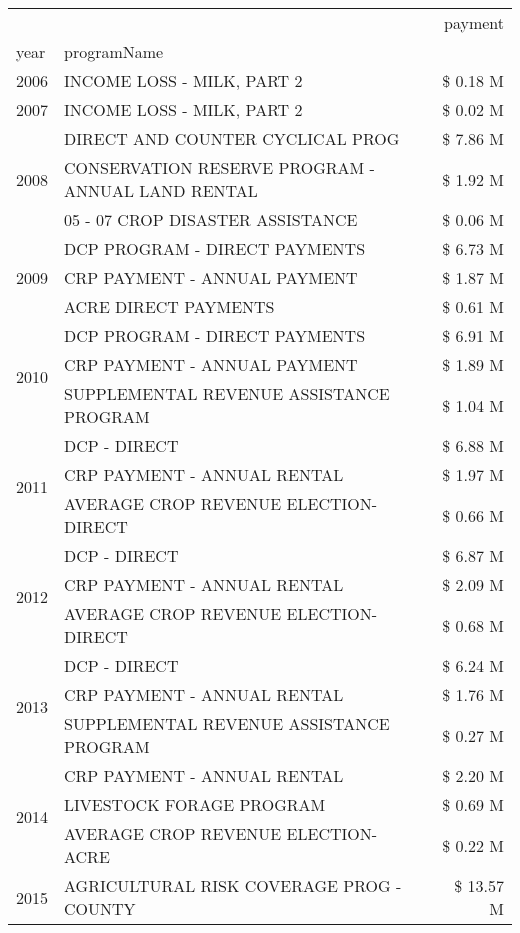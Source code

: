 \begin{tabular}{llr}
\toprule
 &  & payment \\
year & programName &  \\
\midrule
2006 & INCOME LOSS - MILK, PART 2 & \$ 0.18 M \\
\cline{1-3}
2007 & INCOME LOSS - MILK, PART 2 & \$ 0.02 M \\
\cline{1-3}
\multirow[t]{3}{*}{2008} & DIRECT AND COUNTER CYCLICAL PROG & \$ 7.86 M \\
 & CONSERVATION RESERVE PROGRAM - ANNUAL LAND RENTAL & \$ 1.92 M \\
 & 05 - 07 CROP DISASTER ASSISTANCE & \$ 0.06 M \\
\cline{1-3}
\multirow[t]{3}{*}{2009} & DCP PROGRAM - DIRECT PAYMENTS & \$ 6.73 M \\
 & CRP PAYMENT - ANNUAL PAYMENT & \$ 1.87 M \\
 & ACRE DIRECT PAYMENTS & \$ 0.61 M \\
\cline{1-3}
\multirow[t]{3}{*}{2010} & DCP PROGRAM - DIRECT PAYMENTS & \$ 6.91 M \\
 & CRP PAYMENT - ANNUAL PAYMENT & \$ 1.89 M \\
 & SUPPLEMENTAL REVENUE ASSISTANCE PROGRAM & \$ 1.04 M \\
\cline{1-3}
\multirow[t]{3}{*}{2011} & DCP - DIRECT & \$ 6.88 M \\
 & CRP PAYMENT - ANNUAL RENTAL & \$ 1.97 M \\
 & AVERAGE CROP REVENUE ELECTION-DIRECT & \$ 0.66 M \\
\cline{1-3}
\multirow[t]{3}{*}{2012} & DCP - DIRECT & \$ 6.87 M \\
 & CRP PAYMENT - ANNUAL RENTAL & \$ 2.09 M \\
 & AVERAGE CROP REVENUE ELECTION-DIRECT & \$ 0.68 M \\
\cline{1-3}
\multirow[t]{3}{*}{2013} & DCP - DIRECT & \$ 6.24 M \\
 & CRP PAYMENT - ANNUAL RENTAL & \$ 1.76 M \\
 & SUPPLEMENTAL REVENUE ASSISTANCE PROGRAM & \$ 0.27 M \\
\cline{1-3}
\multirow[t]{3}{*}{2014} & CRP PAYMENT - ANNUAL RENTAL & \$ 2.20 M \\
 & LIVESTOCK FORAGE PROGRAM & \$ 0.69 M \\
 & AVERAGE CROP REVENUE ELECTION-ACRE & \$ 0.22 M \\
\cline{1-3}
\multirow[t]{3}{*}{2015} & AGRICULTURAL RISK COVERAGE PROG - COUNTY & \$ 13.57 M \\

\end{tabular}

